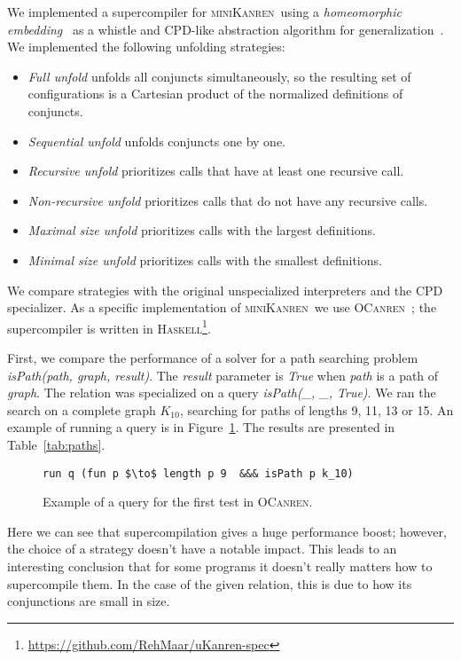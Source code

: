 \documentclass[submission,copyright,creativecommons]{eptcs}
\newcommand{\miniKanren}{\textsc{miniKanren}\ }
\begin{document}
We implemented a supercompiler for \miniKanren using a {\it homeomorphic embedding}~\cite{homeoEmb} as a whistle
and CPD-like abstraction algorithm for generalization~\cite{cpd}.
We implemented the following unfolding strategies:
\begin{itemize}
\item {\it Full unfold} unfolds all conjuncts simultaneously, so
      the resulting set of configurations is a Cartesian product of the normalized definitions of conjuncts.
\item {\it Sequential unfold} unfolds conjuncts one by one.
\item {\it Recursive unfold}     prioritizes calls that have at least one recursive call.
\item {\it Non-recursive unfold} prioritizes calls that do not have any recursive calls.
\item {\it Maximal size unfold}  prioritizes calls with the largest definitions.
\item {\it Minimal size unfold}  prioritizes calls with the smallest definitions.
\end{itemize}

We compare strategies with the original unspecialized interpreters and the CPD specializer.
As a specific implementation of \miniKanren we use \textsc{OCanren}~\cite{ocanren};
the supercompiler is written in \textsc{Haskell}\footnote{\url{https://github.com/RehMaar/uKanren-spec}}.

First, we compare the performance of a solver for a path searching problem \textit{isPath(path, graph, result)}.
The \textit{result} parameter is \textit{True} when \textit{path} is a path of \textit{graph}.
The relation was specialized on a query \textit{isPath(_, _, True)}.
We ran the search on a complete graph $K_{10}$, searching for paths of lengths 9, 11, 13 or 15.
An example of running a query is in Figure~\ref{fig:runQuery1}.
The results are presented in Table~\ref{tab:paths}.

\begin{figure}[h!]
\begin{lstlisting}
run q (fun p $\to$ length p 9  &&& isPath p k_10)
\end{lstlisting}
\caption{Example of a query for the first test in \textsc{OCanren}.}
\label{fig:runQuery1}
\end{figure}

Here we can see that supercompilation gives a huge performance boost;
however, the choice of a strategy doesn't have a notable impact.
This leads to an interesting conclusion that for some programs
it doesn't really matters how to supercompile them.
In the case of the given relation, this is due to how its conjunctions
are small in size.
\end{document}
